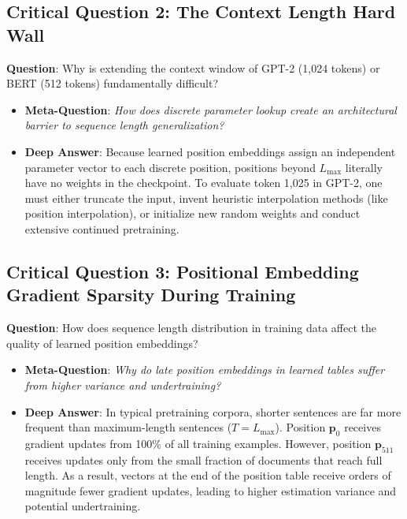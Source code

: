 \documentclass[11pt,a4paper]{article}
\theoremstyle{definition}
\begin{document}
\subsection{\textbf{Critical Question 2: The Context Length Hard Wall}}
\textbf{Question}: Why is extending the context window of GPT-2 (1,024 tokens) or BERT (512 tokens) fundamentally difficult?
\begin{itemize}
    \item \textbf{Meta-Question}: \emph{How does discrete parameter lookup create an architectural barrier to sequence length generalization?}
    \item \textbf{Deep Answer}: Because learned position embeddings assign an independent parameter vector to each discrete position, positions beyond $L_{\text{max}}$ literally have no weights in the checkpoint. To evaluate token 1,025 in GPT-2, one must either truncate the input, invent heuristic interpolation methods (like position interpolation), or initialize new random weights and conduct extensive continued pretraining.
\end{itemize}

\subsection{\textbf{Critical Question 3: Positional Embedding Gradient Sparsity During Training}}
\textbf{Question}: How does sequence length distribution in training data affect the quality of learned position embeddings?
\begin{itemize}
    \item \textbf{Meta-Question}: \emph{Why do late position embeddings in learned tables suffer from higher variance and undertraining?}
    \item \textbf{Deep Answer}: In typical pretraining corpora, shorter sentences are far more frequent than maximum-length sentences ($T = L_{\text{max}}$). Position $\mathbf{p}_0$ receives gradient updates from 100\% of all training examples. However, position $\mathbf{p}_{511}$ receives updates only from the small fraction of documents that reach full length. As a result, vectors at the end of the position table receive orders of magnitude fewer gradient updates, leading to higher estimation variance and potential undertraining.
\end{itemize}
\end{document}
